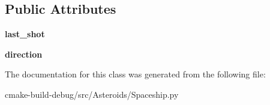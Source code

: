 \subsection*{Public Attributes}
\begin{DoxyCompactItemize}
\item 
{\bfseries last\+\_\+shot}\hypertarget{classSpaceship_1_1Spaceship_a56057cc944d63397439253ba0a070fce}{}\label{classSpaceship_1_1Spaceship_a56057cc944d63397439253ba0a070fce}

\item 
{\bfseries direction}\hypertarget{classSpaceship_1_1Spaceship_a8066f1ca4ab44ccd8287634d79607bd6}{}\label{classSpaceship_1_1Spaceship_a8066f1ca4ab44ccd8287634d79607bd6}

\end{DoxyCompactItemize}


The documentation for this class was generated from the following file\+:\begin{DoxyCompactItemize}
\item 
cmake-\/build-\/debug/src/\+Asteroids/Spaceship.\+py\end{DoxyCompactItemize}
